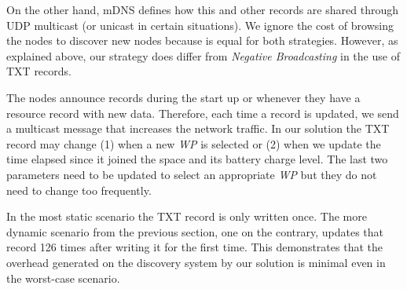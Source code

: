 On the other hand, mDNS defines how this and other records are shared through UDP multicast (or unicast in certain situations).
We ignore the cost of browsing the nodes to discover new nodes because is equal for both strategies.
However, as explained above, our strategy does differ from \emph{Negative Broadcasting} in the use of TXT records.

The nodes announce records during the start up or whenever they have a resource record with new data.
Therefore, each time a record is updated, we send a multicast message that increases the network traffic.
In our solution the TXT record may change 
(1) when a new \emph{WP} is selected or
(2) when we update the time elapsed since it joined the space and its battery charge level.
The last two parameters need to be updated to select an appropriate \emph{WP} but they do not need to change too frequently.

In the most static scenario the TXT record is only written once.
The more dynamic scenario from the previous section, one on the contrary, updates that record 126 times after writing it for the first time.
This demonstrates that the overhead generated on the discovery system by our solution is minimal even in the worst-case scenario.
